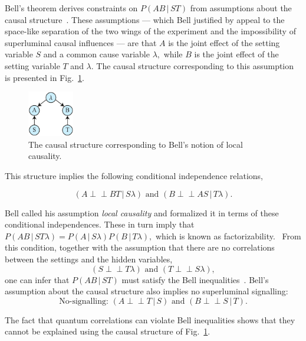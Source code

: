 \documentclass[letterpaper,onecolumn,nofootinbib]{revtex4}
\def\indep{\perp\!\!\!\!\perp}
\begin{document}
Bell's theorem derives constraints
on $P(AB\,|\,ST)$ from assumptions about the causal structure~\cite{Bell1964}.  These assumptions --- which Bell justified by appeal to the space-like separation of the two wings of the experiment and the impossibility of superluminal causal influences --- are that $A$ is the joint effect of the setting variable $S$ and a common cause variable
$\lambda ,$ while $B$ is the joint effect of the setting variable $T$ and $\lambda .$ The causal structure corresponding to this assumption is presented in Fig.~\ref{fig:localcausality}.

\begin{figure}[h]
	\centering
	\includegraphics[width=0.18\textwidth]{localcausality}
 \caption{The causal structure corresponding to Bell's notion of local causality.
 }
       \label{fig:localcausality}
\end{figure}

This structure implies the following conditional independence relations,

\begin{equation*}
(A\indep BT\,|\,S\lambda) \text{ and }(B\indep AS\,|\,T\lambda).
\end{equation*}

Bell called his assumption \emph{local causality} and formalized it in terms
of these conditional independences.  These in turn imply that $
P(AB\,|\,ST\lambda )=P(A\,|\,S\lambda )P(B\,|\,T\lambda ),$ which is known as
factorizability. \ From this condition, together with the assumption that
there are no correlations between the settings and the hidden variables,%
\begin{equation*}
(S\indep T\lambda) \text{ and } (T\indep S\lambda) ,
\end{equation*}
one can infer that $P(AB\,|\,ST)$ must satisfy the Bell
inequalities~\cite{Bell1964,CHSH1969}. Bell's assumption about the causal structure also implies no superluminal signalling:
\begin{equation}\label{eq:nosignalling}
\text{No-signalling: } (A\indep T\,|\,S)\text{ and }(B\indep S\,|\,T).
\end{equation}

The fact that quantum correlations can violate Bell inequalities shows that they cannot be explained using the causal structure of Fig.~\ref{fig:localcausality}.
\end{document}
